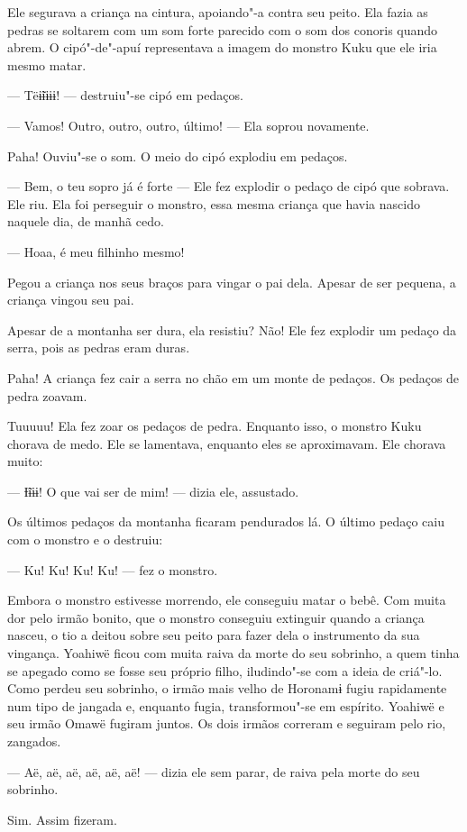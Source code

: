 Ele segurava a criança na cintura, apoiando"-a contra seu peito. Ela
fazia as pedras se soltarem com um som forte parecido com o som dos
conoris quando abrem. O cipó"-de"-apuí representava a imagem do monstro
Kuku que ele iria mesmo matar. 

--- Tëɨ̃ɨɨɨɨ! --- destruiu"-se cipó em pedaços. 

--- Vamos! Outro, outro, outro, último! --- Ela soprou novamente. 

Paha! Ouviu"-se o som. O meio do cipó explodiu em pedaços. 

--- Bem, o teu sopro já é forte --- Ele fez explodir o pedaço de cipó
que sobrava. Ele riu. Ela foi perseguir o monstro, essa mesma criança
que havia nascido naquele dia, de manhã cedo. 

--- Hoaa, é meu filhinho mesmo! 

Pegou a criança nos seus braços para vingar o pai dela. Apesar de ser
pequena, a criança vingou seu pai. 

Apesar de a montanha ser dura, ela resistiu? Não! Ele fez explodir um
pedaço da serra, pois as pedras eram duras. 

Paha! A criança fez cair a serra no chão em um monte de pedaços. Os
pedaços de pedra zoavam.

Tuuuuu! Ela fez zoar os pedaços de pedra. Enquanto isso, o monstro Kuku
chorava de medo. Ele se lamentava, enquanto eles se aproximavam. Ele
chorava muito:

--- Ɨ̃ɨɨɨ! O que vai ser de mim! --- dizia ele, assustado. 

Os últimos pedaços da montanha ficaram pendurados lá. O último pedaço
caiu com o monstro e o destruiu: 

--- Ku! Ku! Ku! Ku! --- fez o monstro. 

Embora o monstro estivesse morrendo, ele conseguiu matar o bebê. Com
muita dor pelo irmão bonito, que o monstro conseguiu extinguir quando a
criança nasceu, o tio a deitou sobre seu peito para fazer dela o
instrumento da sua vingança. Yoahiwë ficou com muita raiva da morte do
seu sobrinho, a quem tinha se apegado como se fosse seu próprio filho,
iludindo"-se com a ideia de criá"-lo. Como perdeu seu sobrinho, o irmão
mais velho de Horonamɨ fugiu rapidamente num tipo de jangada e, enquanto
fugia, transformou"-se em espírito. Yoahiwë e seu irmão Omawë fugiram
juntos. Os dois irmãos correram e seguiram pelo rio, zangados. 

--- Aë, aë, aë, aë, aë, aë! --- dizia ele sem parar, de raiva pela morte
do seu sobrinho. 

Sim. Assim fizeram. 

 
